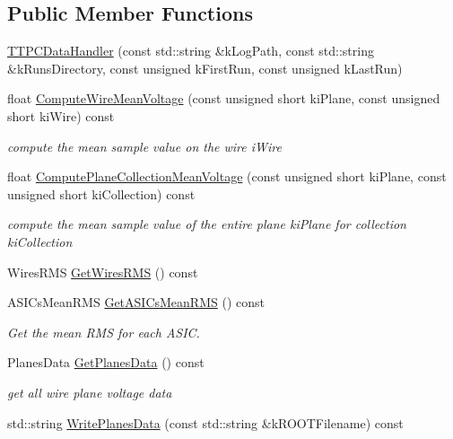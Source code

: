 \subsection*{Public Member Functions}
\begin{DoxyCompactItemize}
\item 
\hyperlink{class_t_t_p_c_data_handler_a65054f0c9a7335a2305de5b63bb84e29}{T\+T\+P\+C\+Data\+Handler} (const std\+::string \&k\+Log\+Path, const std\+::string \&k\+Runs\+Directory, const unsigned k\+First\+Run, const unsigned k\+Last\+Run)
\item 
float \hyperlink{class_t_t_p_c_data_handler_a20538b2bfdb076b6e75bf768d3443f3f}{Compute\+Wire\+Mean\+Voltage} (const unsigned short ki\+Plane, const unsigned short ki\+Wire) const 
\begin{DoxyCompactList}\small\item\em compute the mean sample value on the wire i\+Wire \end{DoxyCompactList}\item 
float \hyperlink{class_t_t_p_c_data_handler_a184f9c2fc4e0cd82cb175624e3e89aaf}{Compute\+Plane\+Collection\+Mean\+Voltage} (const unsigned short ki\+Plane, const unsigned short ki\+Collection) const 
\begin{DoxyCompactList}\small\item\em compute the mean sample value of the entire plane ki\+Plane for collection ki\+Collection \end{DoxyCompactList}\item 
Wires\+R\+M\+S \hyperlink{class_t_t_p_c_data_handler_a0d312c907232f89d96f96ef4dce4a25c}{Get\+Wires\+R\+M\+S} () const 
\item 
A\+S\+I\+Cs\+Mean\+R\+M\+S \hyperlink{class_t_t_p_c_data_handler_a19588e4052efb2c1906384ebf8bad219}{Get\+A\+S\+I\+Cs\+Mean\+R\+M\+S} () const 
\begin{DoxyCompactList}\small\item\em Get the mean R\+M\+S for each A\+S\+I\+C. \end{DoxyCompactList}\item 
Planes\+Data \hyperlink{class_t_t_p_c_data_handler_aa6366249487ef9fc7cd704da7a0fb11f}{Get\+Planes\+Data} () const 
\begin{DoxyCompactList}\small\item\em get all wire plane voltage data \end{DoxyCompactList}\item 
std\+::string \hyperlink{class_t_t_p_c_data_handler_a5e2bb6358b967f29aa1e5e72e286df4a}{Write\+Planes\+Data} (const std\+::string \&k\+R\+O\+O\+T\+Filename) const 

\end{DoxyCompactItemize}
